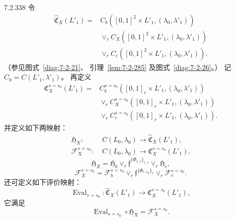 
\begin{definition}{7.2.338}\label{def:7-2-338}
令
\begin{equation}
\begin{aligned}
\widehat{\mathfrak C}_X(L'_1)
={}&C_b([0,1]^2\times L'_1,(\lambda_0,\lambda'_1))\\
&\vee_r C_X([0,1]^2\times L'_1,(\lambda_0,\lambda'_1))\\
&\vee_r C_c([0,1]^2\times L'_1,(\lambda_0,\lambda'_1)).
\end{aligned}
\tag{7.2.339.1}\label{eq:7-2-339-1}
\end{equation}
（参见图式~\ref{diag:7-2-21}、
引理~\ref{lem:7-2-285}
及图式~\ref{diag:7-2-26}。）
记 $C_0=C(L'_1,\lambda'_1)$。
再定义
\begin{equation}
\begin{aligned}
\mathfrak C_X^{s=s_0}(L'_1)
={}&C_b^{s=s_0}
([0,1]_r\times L'_1,(\lambda_0,\lambda'_1))\\
&\vee_r C_X^{s=s_0}
([0,1]_r\times L'_1,(\lambda_0,\lambda'_1))\\
&\vee_r C_c^{s=s_0}
([0,1]_r\times L'_1,(\lambda_0,\lambda'_1)).
\end{aligned}
\tag{7.2.339.2}\label{eq:7-2-339-2}
\end{equation}
并定义如下两映射：
\[
\begin{aligned}
\mathfrak H_X\colon\;&
C(L_0,\lambda_0)
\longrightarrow\widehat{\mathfrak C}_X(L'_1),\\
\mathcal F_X^{s=s_0}\colon\;&
C(L_0,\lambda_0)
\longrightarrow\mathfrak C_X^{s=s_0}(L'_1).
\end{aligned}
\]
\begin{equation}
\mathfrak H_X
=\mathfrak H_b\vee_r
\mathfrak f^{\{\Phi_{r,s}\}_{r,s}}
\vee_r\mathfrak H_c,
\tag{7.2.340.1}\label{eq:7-2-340-1}
\end{equation}
\begin{equation}
\mathcal F_X^{s=s_0}
=\mathcal F_b^{s=s_0}
\vee_r\mathfrak f^{\{\Phi_{r,s_0}\}_r}
\vee_r\mathcal F_c^{s=s_0}.
\tag{7.2.340.2}\label{eq:7-2-340-2}
\end{equation}
还可定义如下评价映射：
\[
\operatorname{Eval}_{s=s_0}\colon
\widehat{\mathfrak C}_X(L'_1)
\longrightarrow
\mathfrak C_X^{s=s_0}(L'_1),
\]
它满足
\begin{equation}
\operatorname{Eval}_{s=s_0}\circ\mathfrak H_X
=\mathcal F_X^{s=s_0}.
\tag{7.2.341}\label{eq:7-2-341}
\end{equation}
\end{definition}

